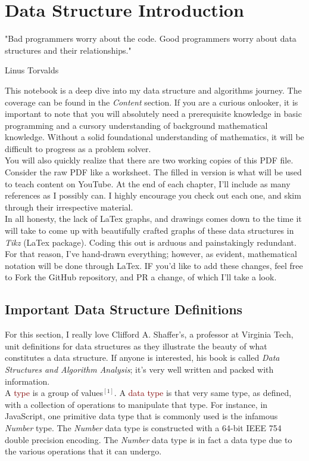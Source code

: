 \frenchspacing
\chapter{Data Structure Introduction}
\epigraph{"Bad programmers worry about the code. Good programmers worry about data structures and their relationships."}{Linus Torvalds}

This notebook is a deep dive into my data structure and algorithms journey. The coverage can be found in the \textit{Content} section. If you are a curious onlooker, it is important to note that you will absolutely need a prerequisite knowledge in basic programming and a cursory understanding of background mathematical knowledge. Without a solid foundational understanding of mathematics, it will be difficult to progress as a problem solver. 
\\

You will also quickly realize that there are two working copies of this PDF file. Consider the raw PDF like a worksheet. The filled in version is what will be used to teach content on YouTube. At the end of each chapter, I'll include as many references as I possibly can. I highly encourage you check out each one, and skim through their irrespective material. 
\\
    
In all honesty, the lack of LaTex graphs, and drawings comes down to the time it will take to come up with beautifully crafted graphs of these data structures in \textit{Tikz} (LaTex package). Coding this out is arduous and painstakingly redundant. For that reason, I've hand-drawn everything; however, as evident, mathematical notation will be done through LaTex. IF you'd like to add these changes, feel free to Fork the GitHub repository, and PR a change, of which I'll take a look.

\section{Important Data Structure Definitions}

For this section, I really love Clifford A. Shaffer's, a professor at Virginia Tech, unit definitions for data structures as they illustrate the beauty of what constitutes a data structure. If anyone is interested, his book is called \textit{Data Structures and Algorithm Analysis}; it's very well written and packed with information. 
\\

A \textcolor{Maroon}{type} is a group of values$^{[1]}$. A  \textcolor{Maroon}{data type} is that very same type, as defined, with a collection of operations to manipulate that type. For instance, in JavaScript, one primitive data type that is commonly used is the infamous \textit{Number} type. The \textit{Number} data type is constructed with a 64-bit IEEE 754 double precision encoding. The \textit{Number} data type is in fact a data type due to the various operations that it can undergo.
\\

